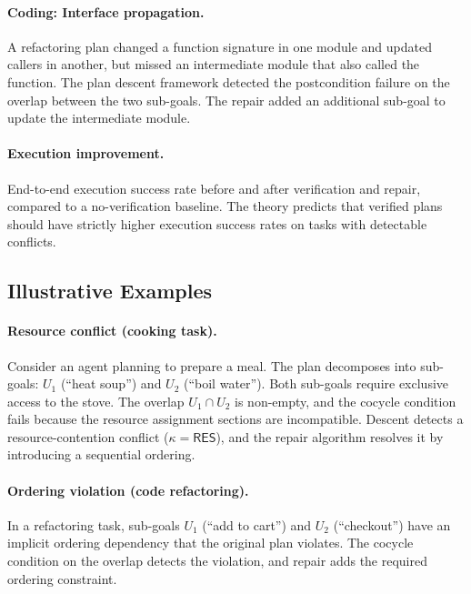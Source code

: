 \documentclass[11pt]{article}
\newcommand{\SubGoal}[1]{U_{#1}}
\begin{document}
\paragraph{Coding: Interface propagation.}
A refactoring plan changed a function signature in one module
and updated callers in another, but missed an intermediate
module that also called the function.  The plan descent framework
detected the postcondition failure on the overlap between the
two sub-goals.  The repair added an additional sub-goal to update
the intermediate module.

\paragraph{Execution improvement.}
End-to-end execution success rate before and after verification and
repair, compared to a no-verification baseline.  The theory predicts
that verified plans should have strictly higher execution success
rates on tasks with detectable conflicts.

\subsection{Illustrative Examples}\label{ssec:examples}

\paragraph{Resource conflict (cooking task).}
Consider an agent planning to prepare a meal.  The plan decomposes
into sub-goals: $\SubGoal{1}$ (``heat soup'') and $\SubGoal{2}$
(``boil water'').  Both sub-goals require exclusive access to the
stove.  The overlap $\SubGoal{1} \cap \SubGoal{2}$ is non-empty, and
the cocycle condition fails because the resource assignment sections
are incompatible.  Descent detects a resource-contention conflict
($\kappa = \mathsf{RES}$), and the repair algorithm resolves it by
introducing a sequential ordering.

\paragraph{Ordering violation (code refactoring).}
In a refactoring task, sub-goals $\SubGoal{1}$ (``add to cart'')
and $\SubGoal{2}$ (``checkout'') have an implicit ordering
dependency that the original plan violates.  The cocycle condition
on the overlap detects the violation, and repair adds the
required ordering constraint.
\end{document}
